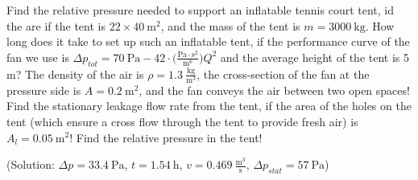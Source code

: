 Find the relative pressure needed to support an inflatable tennis court tent, id the are if the tent is $22\times 40~\mathrm{m^2}$, and the mass of the tent is $m=3000~\mathrm{kg}$. How long does it take to set up such an inflatable tent, if the performance curve of the fan we use is $\Delta p_{tot} = 70~\mathrm{Pa} - 42\cdot \Big(\frac{\mathrm{Pa}\cdot\mathrm{s^2}}{\mathrm{m^6}} \Big)Q^2$ and the average height of the tent is 5 m? The density of the air is $\rho = 1.3~\frac{\mathrm{kg}}{\mathrm{m^3}}$, the cross-section of the fan at the pressure side is $A=0.2~\mathrm{m^2}$, and the fan conveys the air between two open spaces! Find the stationary leakage flow rate from the tent, if the area of the holes on the tent (which ensure a cross flow through the tent to provide fresh air) is $A_l = 0.05~\mathrm{m^2}$! Find the relative pressure in the tent!

(Solution: $\Delta p = 33.4~\mathrm{Pa}$, $t=1.54~\mathrm{h}$, $v=0.469~\frac{\mathrm{m^3}}{\mathrm{s}}$, $\Delta p_{stat} = 57~\mathrm{Pa}$)



